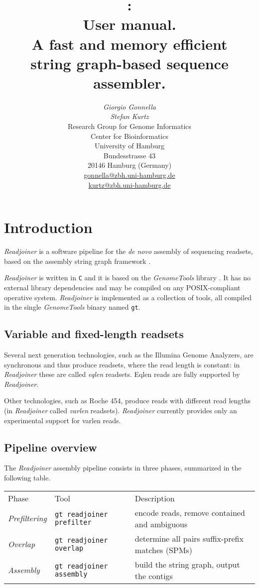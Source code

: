 \documentclass[12pt,titlepage]{article}
\title{\Huge{\Readjoiner 1.0:\\ User manual.}\\[3mm]
\Large{A fast and memory efficient \\string
 graph-based sequence assembler.}}
\author{\begin{tabular}{c}
         \textit{Giorgio Gonnella}\\
         \textit{Stefan Kurtz}\\[2cm]
         Research Group for Genome Informatics\\
         Center for Bioinformatics\\
         University of Hamburg\\
         Bundesstrasse 43\\
         20146 Hamburg (Germany)\\[1cm]
         \url{gonnella@zbh.uni-hamburg.de}\\
         \url{kurtz@zbh.uni-hamburg.de}\\[1cm]
        \end{tabular}}
\newcommand{\GenomeTools}{\textit{GenomeTools}\xspace}
\newcommand{\Readjoiner}{\textit{Readjoiner}\xspace}
\newcommand{\Gtcmd}{\texttt{gt}\xspace}
\newcommand{\Rdjprefiltercmd}{\texttt{gt readjoiner prefilter}\xspace}
\newcommand{\Rdjoverlapcmd}{\texttt{gt readjoiner overlap}\xspace}
\newcommand{\Rdjassemblycmd}{\texttt{gt readjoiner assembly}\xspace}
\begin{document}
\maketitle

\section{Introduction} \label{Introduction}

\Readjoiner is a software pipeline for the \textit{de novo} assembly of
 sequencing readsets, based on the assembly string graph framework
  \cite{MYE:2005}.

\Readjoiner is written in \texttt{C} and it is based on the
\GenomeTools library \cite{genometools}. It has no external library
dependencies and may be compiled on any POSIX-compliant operative system.
 \Readjoiner is implemented as a collection of tools, all compiled in the single
\GenomeTools binary named \Gtcmd.

\subsection{Variable and fixed-length readsets}

Several next generation technologies, such
as the Illumina Genome Analyzers, are synchronous and thus produce
readsets, where the read length is constant: in \Readjoiner these
are called \textit{eqlen} readsets.
Eqlen reads are fully supported by \Readjoiner.

Other technologies, such as Roche 454, produce
reads with different read lengths (in \Readjoiner called \textit{varlen}
readsets). \Readjoiner currently provides only an experimental support for varlen reads.

\subsection{Pipeline overview}

The \Readjoiner assembly pipeline consists in three phases, summarized in the
 following table.

\begin{tabular}{lll}
Phase & Tool & Description \\
\textit{Prefiltering} & \Rdjprefiltercmd &
  encode reads, remove contained and ambiguous\\
\textit{Overlap}   & \Rdjoverlapcmd &
  determine all pairs suffix-prefix matches (SPMs) \\
\textit{Assembly}  & \Rdjassemblycmd &
 build the string graph, output the contigs \\
\end{tabular}
\end{document}
